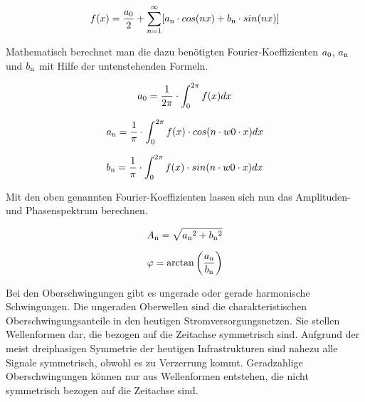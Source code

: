 \begin{equation}
f(x) = {\frac{a\textsubscript{0}}{2}}+\sum_{n=1}^\infty[a\textsubscript{n} \cdot cos(nx)+b\textsubscript{n} \cdot sin(nx)]
\end{equation}


Mathematisch berechnet man die dazu benötigten Fourier-Koeffizienten $a\textsubscript{0}$, $a\textsubscript{n}$ und $b\textsubscript{n}$ mit Hilfe der untenstehenden Formeln.

\begin{equation}
a\textsubscript{0} =  {\frac{1}{2\pi} \cdot \int_{0}^{2\pi} f(x) dx}
\end{equation}

\begin{equation}
a\textsubscript{n} =  {\frac{1}{\pi} \cdot \int_{0}^{2\pi} f(x) \cdot cos(n \cdot w0 \cdot x) dx}
\end{equation}

\begin{equation}
b\textsubscript{n} =  {\frac{1}{\pi} \cdot \int_{0}^{2\pi} f(x) \cdot sin(n \cdot w0 \cdot x) dx}
\end{equation}

Mit den oben genannten Fourier-Koeffizienten lassen sich nun das Amplituden- und Phasenspektrum berechnen.
 
\begin{equation}
A\textsubscript{n} = {\sqrt{a\textsubscript{n}^2+b\textsubscript{n}^2}}
\end{equation}

\begin{equation}
\varphi = \arctan\left( \frac{a\textsubscript{n}}{b\textsubscript{n}}\right) 
\end{equation}

Bei den Oberschwingungen gibt es ungerade oder gerade harmonische Schwingungen.
Die ungeraden Oberwellen sind die charakteristischen Oberschwingungsanteile in den heutigen Stromversorgungsnetzen. Sie stellen Wellenformen dar, die bezogen auf die Zeitachse symmetrisch sind. Aufgrund der meist dreiphasigen Symmetrie der heutigen Infrastrukturen sind nahezu alle Signale symmetrisch, obwohl es zu Verzerrung kommt. Geradzahlige Oberschwingungen können nur aus Wellenformen entstehen, die nicht symmetrisch bezogen auf die Zeitachse sind.

